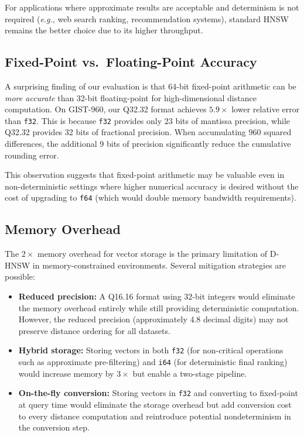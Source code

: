 \documentclass[10pt,journal,compsoc]{IEEEtran}
\newcommand{\dhnsw}{\textsc{D-HNSW}}
\newcommand{\hnsw}{\textsc{HNSW}}
\newcommand{\eg}{\textit{e.g.}}
\begin{document}
For applications where approximate results are acceptable and determinism is not required (\eg, web search ranking, recommendation systems), standard \hnsw{} remains the better choice due to its higher throughput.

\subsection{Fixed-Point vs.\ Floating-Point Accuracy}

A surprising finding of our evaluation is that 64-bit fixed-point arithmetic can be \emph{more accurate} than 32-bit floating-point for high-dimensional distance computation. On GIST-960, our Q32.32 format achieves $5.9\times$ lower relative error than \texttt{f32}. This is because \texttt{f32} provides only 23 bits of mantissa precision, while Q32.32 provides 32 bits of fractional precision. When accumulating 960 squared differences, the additional 9 bits of precision significantly reduce the cumulative rounding error.

This observation suggests that fixed-point arithmetic may be valuable even in non-deterministic settings where higher numerical accuracy is desired without the cost of upgrading to \texttt{f64} (which would double memory bandwidth requirements).

\subsection{Memory Overhead}

The $2\times$ memory overhead for vector storage is the primary limitation of \dhnsw{} in memory-constrained environments. Several mitigation strategies are possible:

\begin{itemize}[leftmargin=*]
  \item \textbf{Reduced precision:} A Q16.16 format using 32-bit integers would eliminate the memory overhead entirely while still providing deterministic computation. However, the reduced precision (approximately $4.8$ decimal digits) may not preserve distance ordering for all datasets.

  \item \textbf{Hybrid storage:} Storing vectors in both \texttt{f32} (for non-critical operations such as approximate pre-filtering) and \texttt{i64} (for deterministic final ranking) would increase memory by $3\times$ but enable a two-stage pipeline.

  \item \textbf{On-the-fly conversion:} Storing vectors in \texttt{f32} and converting to fixed-point at query time would eliminate the storage overhead but add conversion cost to every distance computation and reintroduce potential nondeterminism in the conversion step.
\end{itemize}
\end{document}
